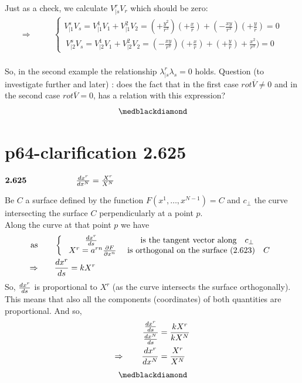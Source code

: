 Just as a check, we calculate $V^r_{|s}V_r$ which should be zero:
\begin{align}
\Rightarrow \quad\quad &\left \{ \begin{array}{c}V^s_{|1}V_s = V^1_{|1}V_1+V^2_{|1}V_2 = (+\frac{y^2}{r^3})(+\frac{x}{r})+ (-\frac{xy}{r^3})(+\frac{y}{r}) =0\\
\ V^s_{|2}V_s = V^1_{|2}V_1+V^2_{|2}V_2 = (-\frac{xy}{r^3})(+\frac{x}{r})+ (+\frac{y}{r})+\frac{x^2}{r^3}) = 0
\end{array} \right.
\end{align}\\
So, in the second example the relationship $\lambda^r_{|s}\lambda_s = 0$ holds.
Question (to investigate further and later) : does the fact that in the first case $rot\overline{V}  \ne 0$ and in the second case $rot \overline{V} = 0$, has a relation with this expression?
$$\medblackdiamond$$
\newpage

\section{p64-clarification 2.625}
\begin{tcolorbox}
$\textbf{2.625} \quad\quad\quad\quad\quad\quad \dv{ x^r}{x^N} = \frac{X^r}{X^N}$
\end{tcolorbox}
Be $C$ a surface defined by the function $F(x^1,\dots, x^{N-1}) = C$ and  $c_{\perp}$ the curve intersecting the surface $C$ perpendicularly at a point $p$.\\
Along the curve at that point $p$ we have
\begin{align}
\text{as}\quad\quad & \left \{ \begin{array}{cc}
\dv{ x^r}{s}& \text{is the tangent vector along}\quad c_{\perp}\\
\ X^r = a^{rn}\pdv{F}{x^n}& \text{ is orthogonal on the surface (2.623)}\quad C\\
\end{array}\right.\\
\Rightarrow \quad\quad & \dv{ x^r}{s} = kX^r
\end{align}
So, $\dv{ x^r}{s}$ is proportional to $X^r$ (as the curve intersects the surface orthogonally). This means that also all the components (coordinates) of both quantities are proportional. And so,
\begin{align}
\frac{\dv{ x^r}{s}}{\dv{ x^N}{s}} &= \frac{kX^r}{kX^N}\\
\Rightarrow\quad\quad \dv{ x^r}{x^N} &= \frac{X^r}{X^N}
\end{align}
$$\medblackdiamond$$
\newpage

